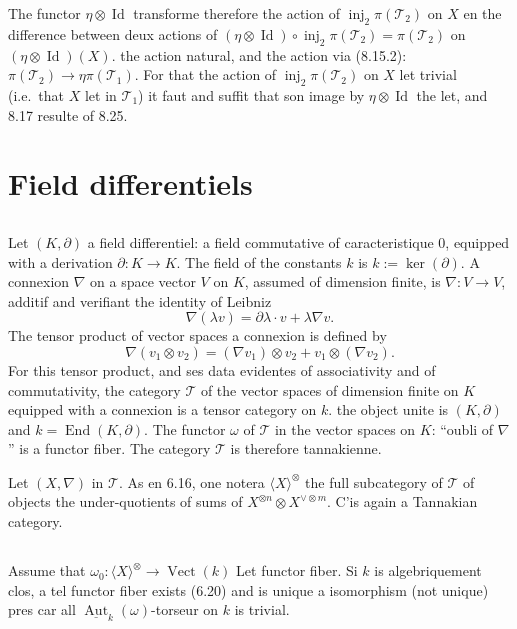 \documentclass[12pt,a4paper]{article}
\theoremstyle{plain}
\theoremstyle{definition}
\DeclareMathOperator{\End}{End}
\DeclareMathOperator{\Aut}{Aut}
\DeclareMathOperator{\Id}{Id}
\DeclareMathOperator{\Vect}{Vect}
\DeclareMathOperator{\inj}{inj}
\begin{document}
The functor $\eta \otimes \Id$ transforme therefore the action of $\inj_2 \pi(\mathcal{T}_2)$ on $X$ en the difference between deux actions of $(\eta \otimes \Id) \circ \inj_2 \pi(\mathcal{T}_2) = \pi(\mathcal{T}_2)$ on $(\eta \otimes \Id)(X)$. the action natural, and the action via (8.15.2): $\pi(\mathcal{T}_2) \to \eta \pi(\mathcal{T}_1)$. For that the action of $\inj_2 \pi(\mathcal{T}_2)$ on $X$ let trivial (i.e.~that $X$ let in $\mathcal{T}_1$) it faut and suffit that son image by $\eta \otimes \Id$ the let, and 8.17 resulte of 8.25.

\section{Field differentiels}

\subsection{}

Let $(K, \partial)$ a field differentiel: a field commutative of caracteristique 0, equipped with a derivation $\partial : K \to K$. The field of the constants $k$ is $k := \ker(\partial)$. A connexion $\nabla$ on a space vector $V$ on $K$, assumed of dimension finite, is $\nabla : V \to V$, additif and verifiant the identity of Leibniz
\[
\nabla(\lambda v) = \partial\lambda \cdot v + \lambda \nabla v.
\]
The tensor product of vector spaces a connexion is defined by
\[
\nabla(v_1 \otimes v_2) = (\nabla v_1) \otimes v_2 + v_1 \otimes (\nabla v_2).
\]
For this tensor product, and ses data evidentes of associativity and of commutativity, the category $\mathcal{T}$ of the vector spaces of dimension finite on $K$ equipped with a connexion is a tensor category on $k$. the object unite is $(K, \partial)$ and $k = \End(K, \partial)$. The functor $\omega$ of $\mathcal{T}$ in the vector spaces on $K$: ``oubli of $\nabla$'' is a functor fiber. The category $\mathcal{T}$ is therefore tannakienne.

Let $(X, \nabla)$ in $\mathcal{T}$. As en 6.16, one notera $\langle X \rangle^\otimes$ the full subcategory of $\mathcal{T}$ of objects the under-quotients of sums of $X^{\otimes n} \otimes X^{\vee \otimes m}$. C'is again a Tannakian category.

\subsection{}

Assume that $\omega_0 : \langle X \rangle^\otimes \to \Vect(k)$ Let functor fiber. Si $k$ is algebriquement clos, a tel functor fiber exists (6.20) and is unique a isomorphism (not unique) pres car all $\underline{\Aut}_k(\omega)$-torseur on $k$ is trivial.
\end{document}
